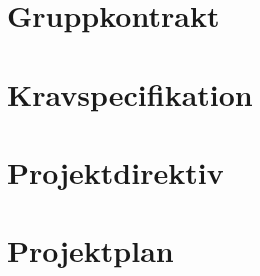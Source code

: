 \documentclass[a4paper,12pt,twoside,openright]{report}
\begin{document}
\begin{appendices}
\chapter{Gruppkontrakt}
\label{appendix:Gruppkontrakt}
\clearpage
\null
\newpage
	
%

\chapter{Kravspecifikation}
\label{appendix:kravspecifikation}
\clearpage
\null
\newpage
	
%	

\chapter{Projektdirektiv}
\label{appendix:projektdirektiv}
\clearpage
\null
\newpage
	
%
%

\chapter{Projektplan}
\label{appendix:projektplan}
\clearpage
\null
\newpage
	
%
%


\end{appendices}
\end{document}
